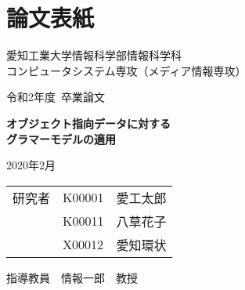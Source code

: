 \chapter{論文表紙}
\thispagestyle{myheadings}

\vspace{-1.0cm}

\begin{center}

{\LARGE 愛知工業大学情報科学部情報科学科\\
コンピュータシステム専攻（メディア情報専攻）

\vspace{1.0cm}

令和2年度~卒業論文\\

\vspace{2.0cm}

{\Huge 
\baselineskip=15mm
\textbf{オブジェクト指向データに対する\\
グラマーモデルの適用\\}}

\vspace{7.0cm}

2020年2月\\

\vspace{1.0cm}

\begin{tabular}[h]{lll}
  研究者  & K00001 & 愛工太郎\\
         & K00011 & 八草花子\\
         & X00012 & 愛知環状\\
\end{tabular}

\vspace{1.0cm}

指導教員\ \ 情報一郎\ \ 教授}

\end{center}

